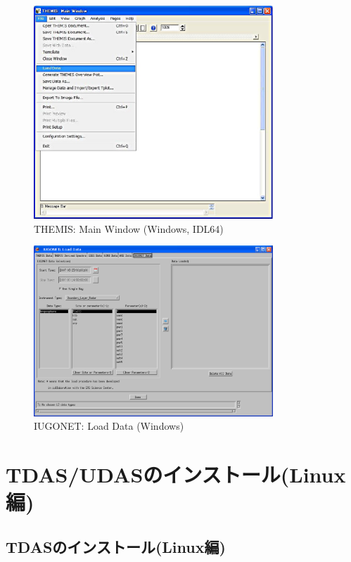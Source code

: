 \documentclass[a4j]{jbook}
\begin{document}
\begin{figure}[H]
\begin{center}
\includegraphics[width=9cm]{fig_idl64/Fig8.eps}
\caption{THEMIS: Main Window (Windows, IDL64)}
\label{idl64/Fig8.eps}
\end{center}
\end{figure}

\begin{figure}[H]
\begin{center}
\includegraphics[width=9cm]{images/thm_gui_windows2.eps}
\caption{IUGONET: Load Data (Windows)}
\label{thm_gui_windows2.eps}
\end{center}
\end{figure}

\part{TDAS/UDASのインストール(Linux編)}

\chapter{TDASのインストール(Linux編)}
\label{tdas_install_linux}
\end{document}
